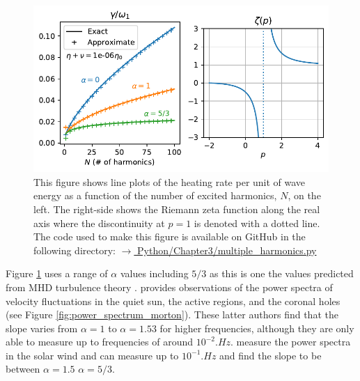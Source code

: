 \begin{figure}
    \centering
    \vspace{-20pt}
    \includegraphics[width=\textwidth,height=0.85\textheight,keepaspectratio]{figures/chapter03/multiple_harmonics.pdf}
    \vspace{-30pt}
    \caption{This figure shows line plots of the heating rate per unit of wave energy as a function of the number of excited harmonics, $N$, on the left. 
    The right-side shows the Riemann zeta function along the real axis where the discontinuity at $p=1$ is denoted with a dotted line. The code used to make this figure is available on GitHub in the following directory:\newline
    \href{https://github.com/aleksyprok/apkp_thesis/blob/main/Python/Chapter3/multiple_harmonics.py}{$\rightarrow$ Python/Chapter3/multiple\_harmonics.py}}
    \vspace{-20pt}
    \label{fig:multiple_harmonics}
\end{figure}

Figure \ref{fig:multiple_harmonics} uses a range of $\alpha$ values including $5/3$ as this is one the values predicted from MHD turbulence theory \citep{Bruno2013}. \citet{Morton2016} provides observations of the power spectra of velocity fluctuations in the quiet sun, the active regions, and the coronal holes (see Figure \ref{fig:power_spectrum_morton}). These latter authors find that the slope varies from $\alpha = 1$ to $\alpha = 1.53$ for higher frequencies, although they are only able to measure up to frequencies of around $10^{-2}\si{.Hz}$. \citet{Podesta2007} measure the power spectra in the solar wind and can measure up to $10^{-1}\si{.Hz}$ and find the slope to be between $\alpha = 1.5$ $\alpha = 5/3$.

